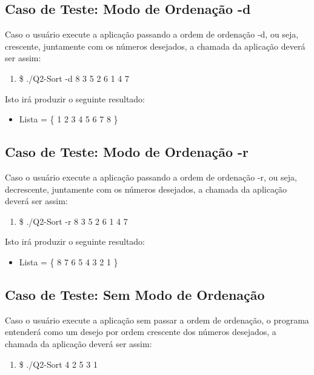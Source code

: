   \subsection{Caso de Teste: Modo de Ordenação -d}

  Caso o usuário execute a aplicação passando a ordem de ordenação -d, ou seja, crescente, juntamente com os números
  desejados, a chamada da aplicação deverá ser assim:

  \begin{enumerate}
    \item \$ ./Q2-Sort -d 8 3 5 2 6 1 4 7
  \end{enumerate}


  Isto irá produzir o seguinte resultado:

  \begin{itemize}
    \item Lista = \{ 1 2 3 4 5 6 7 8 \}
  \end{itemize}

  \subsection{Caso de Teste: Modo de Ordenação -r}

  Caso o usuário execute a aplicação passando a ordem de ordenação -r, ou seja, decrescente, juntamente com os números
  desejados, a chamada da aplicação deverá ser assim:

  \begin{enumerate}
    \item \$ ./Q2-Sort -r 8 3 5 2 6 1 4 7
  \end{enumerate}


  Isto irá produzir o seguinte resultado:

  \begin{itemize}
    \item Lista = \{ 8 7 6 5 4 3 2 1 \}
  \end{itemize}

  \subsection{Caso de Teste: Sem Modo de Ordenação}

  Caso o usuário execute a aplicação sem passar a ordem de ordenação, o programa entenderá como um desejo por ordem
  crescente dos números desejados, a chamada da aplicação deverá ser assim:

  \begin{enumerate}
    \item \$ ./Q2-Sort 4 2 5 3 1
  \end{enumerate}


